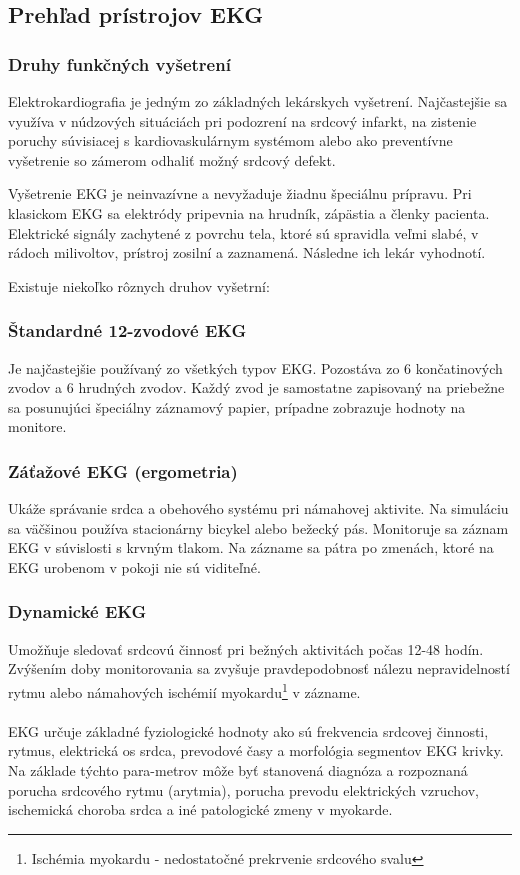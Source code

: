 \documentclass[titlepage,12pt]{article}
\begin{document}


\newpage 
\subsection{Prehľad prístrojov EKG}
\subsubsection{Druhy funkčných vyšetrení}
Elektrokardiografia je jedným zo základných lekárskych vyšetrení. Najčastejšie sa využíva \linebreak v núdzových situáciách pri podozrení na srdcový infarkt, na zistenie poruchy súvisiacej s kardiovaskulárnym systémom alebo ako preventívne vyšetrenie so zámerom odhaliť možný srdcový defekt.

Vyšetrenie EKG je neinvazívne a nevyžaduje žiadnu špeciálnu prípravu. Pri klasickom EKG sa elektródy pripevnia na hrudník, zápästia a členky pacienta. Elektrické signály zachytené \linebreak z povrchu tela, ktoré sú spravidla veľmi slabé, v rádoch milivoltov, prístroj zosilní a zaznamená. Následne ich lekár vyhodnotí.

Existuje niekoľko rôznych druhov vyšetrní:
\subsubsection*{Štandardné 12-zvodové EKG}
Je najčastejšie používaný zo všetkých typov EKG. Pozostáva zo 6 končatinových zvodov a 6 hrudných zvodov. Každý zvod je samostatne zapisovaný na priebežne sa posunujúci špeciálny záznamový papier, prípadne zobrazuje hodnoty na monitore.
\subsubsection*{Záťažové EKG (ergometria)}
Ukáže správanie srdca a obehového systému pri námahovej aktivite. Na simuláciu sa väčšinou používa stacionárny bicykel alebo bežecký pás. Monitoruje sa záznam EKG v súvislosti \linebreak s krvným tlakom. Na zázname sa pátra po zmenách, ktoré na EKG urobenom v pokoji nie sú viditeľné.
\subsubsection*{Dynamické EKG}
Umožňuje sledovať srdcovú činnosť pri bežných aktivitách počas 12-48 hodín. Zvýšením doby monitorovania sa zvyšuje pravdepodobnosť nálezu nepravidelností rytmu alebo námahových ischémií myokardu\footnote{Ischémia myokardu - nedostatočné prekrvenie srdcového svalu} v zázname.
\\
\\
EKG určuje základné fyziologické hodnoty ako sú frekvencia srdcovej činnosti, rytmus, elektrická os srdca, prevodové časy a morfológia segmentov EKG krivky. Na základe týchto para-metrov môže byť stanovená diagnóza a rozpoznaná porucha srdcového rytmu (arytmia), porucha prevodu elektrických vzruchov, ischemická choroba srdca a iné patologické zmeny v myokarde.
\end{document}
